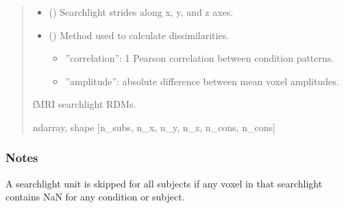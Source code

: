 \documentclass[letterpaper,10pt,english]{sphinxhowto}
\begin{document}
\begin{fulllineitems}
\begin{quote}
\begin{description}
\begin{itemize}
\item {} 
\sphinxAtStartPar
{} (\sphinxstyleliteralemphasis{\sphinxupquote{, }}\sphinxstyleliteralemphasis{\sphinxupquote{(}}\sphinxstyleliteralemphasis{\sphinxupquote{, }}\sphinxstyleliteralemphasis{\sphinxupquote{, }}\sphinxstyleliteralemphasis{\sphinxupquote{)}}) \textendash{} Searchlight strides along x, y, and z axes.

\item {} 
\sphinxAtStartPar
{} (\sphinxstyleliteralemphasis{\sphinxupquote{, }}\sphinxstyleliteralemphasis{\sphinxupquote{, }}) \textendash{} 
\sphinxAtStartPar
Method used to calculate dissimilarities.
\begin{itemize}
\item {} 
\sphinxAtStartPar
”correlation”: 1 \sphinxhyphen{} Pearson correlation between condition patterns.

\item {} 
\sphinxAtStartPar
”amplitude”: absolute difference between mean voxel amplitudes.

\end{itemize}


\end{itemize}

\sphinxAtStartPar
{} \textendash{} fMRI searchlight RDMs.

\sphinxAtStartPar
ndarray, shape {[}n\_subs, n\_x, n\_y, n\_z, n\_cons, n\_cons{]}

\end{description}\end{quote}
\subsubsection*{Notes}

\sphinxAtStartPar
A searchlight unit is skipped for all subjects if any voxel in that
searchlight contains NaN for any condition or subject.

\end{fulllineitems}
\end{document}
